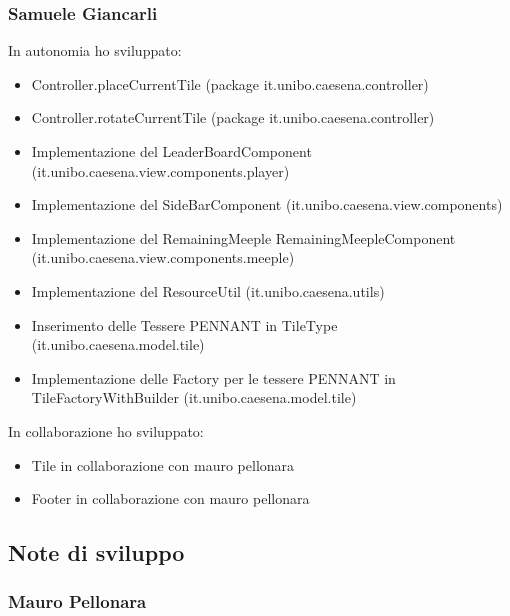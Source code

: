 \subsubsection*{Samuele Giancarli}
In autonomia ho sviluppato:
\begin{itemize}
    \item Controller.placeCurrentTile (package it.unibo.caesena.controller)
    \item Controller.rotateCurrentTile (package it.unibo.caesena.controller)
    \item Implementazione del LeaderBoardComponent (it.unibo.caesena.view.components.player)
    \item Implementazione del SideBarComponent (it.unibo.caesena.view.components)
    \item Implementazione del RemainingMeeple RemainingMeepleComponent (it.unibo.caesena.view.components.meeple)
    \item Implementazione del ResourceUtil (it.unibo.caesena.utils)
    \item Inserimento delle Tessere PENNANT in TileType (it.unibo.caesena.model.tile)
    \item Implementazione delle Factory per le tessere PENNANT in TileFactoryWithBuilder (it.unibo.caesena.model.tile)
\end{itemize}

In collaborazione ho sviluppato:
\begin{itemize}
    \item Tile in collaborazione con mauro pellonara
    \item Footer in collaborazione con mauro pellonara
\end{itemize}

\subsection{Note di sviluppo}
\subsubsection*{Mauro Pellonara}

